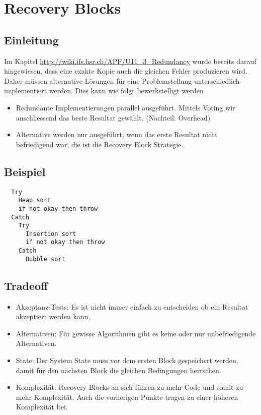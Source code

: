 \section{Recovery Blocks}


\subsection{Einleitung}

Im Kapitel \url{http://wiki.ifs.hsr.ch/APF/U11_3_Redundancy} wurde bereits darauf hingewiesen, dass eine exakte Kopie auch die gleichen Fehler produzieren wird. Daher müssen alternative Lösungen für eine Problemstellung unterschiedlich implementiert werden. Dies kann wie folgt bewerkstelligt werden
\begin{itemize}
	\item Redundante Implementierungen parallel ausgeführt. Mittels Voting wir anschliessend das beste Resultat gewählt. (Nachteil: Overhead)
	\item Alternative werden nur ausgeführt, wenn das erste Resultat nicht befriedigend war, die ist die Recovery Block Strategie.
\end{itemize}

\subsection{Beispiel}

\begin{verbatim}
  Try
    Heap sort
    if not okay then throw
  Catch
    Try
      Insertion sort
      if not okay then throw
    Catch
      Bubble sort
\end{verbatim}

\subsection{Tradeoff}

\begin{itemize}
	\item Akzeptanz-Tests: Es ist nicht immer einfach zu entscheiden ob ein Resultat akzeptiert werden kann.
	\item Alternativen: Für gewisse Algorithmen gibt es keine oder nur unbefriedigende Alternativen.
	\item State: Der System State muss vor dem ersten Block gespeichert werden, damit für den nächsten Block die gleichen Bedingungen herrschen.
	\item Komplexität: Recovery Blocks an sich führen zu mehr Code und somit zu mehr Komplexität. Auch die vorherigen Punkte tragen zu einer höheren Komplexität bei.
\end{itemize}


